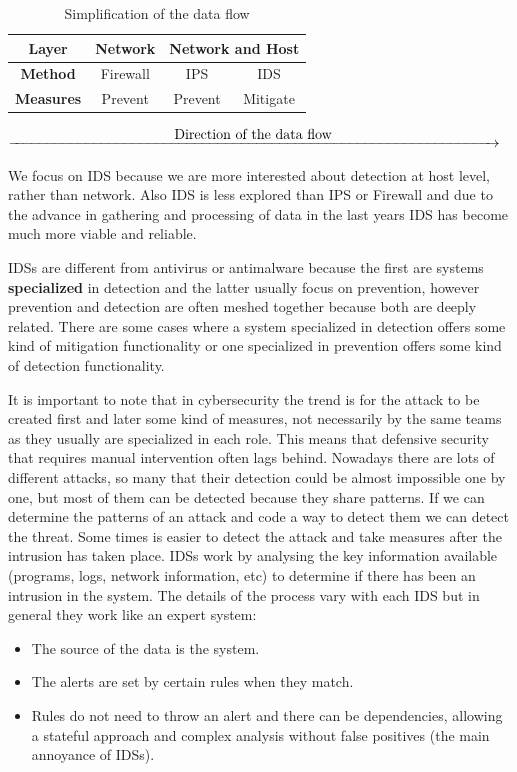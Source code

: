 \begin{table}[H]
	\centering
	\caption{Simplification of the data flow}
\linej
	\begin{tabular}{|c|c|c|c|}
	\hline
		\textbf{Layer} & \textbf{Network} & \multicolumn{2}{c|}{\textbf{Network and Host}}\\ \hline
		\textbf{Method} & Firewall & IPS & IDS\\ \hline
		\textbf{Measures} & Prevent & Prevent & Mitigate\\ \hline
	\end{tabular}
\end{table}
$\xrightarrow{\makebox[\textwidth]{Direction of the data flow}}$

\linej
\linej
We focus on IDS because we are more interested about detection at host level, rather than network. Also IDS is less explored than IPS or Firewall and due to the advance in gathering and processing of data in the last years IDS has become much more viable and reliable.

\linej
\linej
IDSs are different from antivirus or antimalware because the first are systems \textbf{specialized} in detection and the latter usually focus on prevention, however prevention and detection are often meshed together because both are deeply related. There are some cases where a system specialized in detection offers some kind of mitigation functionality or one specialized in prevention offers some kind of detection functionality.

\linej
\linej
It is important to note that in cybersecurity the trend is for the attack to be created first and later some kind of measures, not necessarily by the same teams as they usually are specialized in each role. This means that defensive security that requires manual intervention often lags behind.
\linej
Nowadays there are lots of different attacks, so many that their detection could be almost impossible one by one, but most of them can be detected because they share patterns. If we can determine the patterns of an attack and code a way to detect them we can detect the threat. Some times is easier to detect the attack and take measures after the intrusion has taken place.
\linej
\linej
IDSs work by analysing the key information available (programs, logs, network information, etc) to determine if there has been an intrusion in the system. The details of the process vary with each IDS but in general they work like an expert system:
\begin{itemize}
	\item The source of the data is the system.
	\item The alerts are set by certain rules when they match.
	\item Rules do not need to throw an alert and there can be dependencies, allowing a stateful approach and complex analysis without false positives (the main annoyance of IDSs).
\end{itemize}

